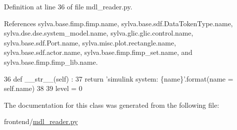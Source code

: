 Definition at line 36 of file mdl\+\_\+reader.\+py.



References sylva.\+base.\+fimp.\+fimp.\+name, sylva.\+base.\+sdf.\+Data\+Token\+Type.\+name, sylva.\+dse.\+dse.\+system\+\_\+model.\+name, sylva.\+glic.\+glic.\+control.\+name, sylva.\+base.\+sdf.\+Port.\+name, sylva.\+misc.\+plot.\+rectangle.\+name, sylva.\+base.\+sdf.\+actor.\+name, sylva.\+base.\+fimp.\+fimp\+\_\+set.\+name, and sylva.\+base.\+fimp.\+fimp\+\_\+lib.\+name.


\begin{DoxyCode}
36     \textcolor{keyword}{def }\_\_str\_\_(self) :
37       \textcolor{keywordflow}{return} \textcolor{stringliteral}{'simulink system: \{name\}'}.format(name = self.name)
38 
39   level = 0
\end{DoxyCode}


The documentation for this class was generated from the following file\+:\begin{DoxyCompactItemize}
\item 
frontend/\hyperlink{mdl__reader_8py}{mdl\+\_\+reader.\+py}\end{DoxyCompactItemize}

